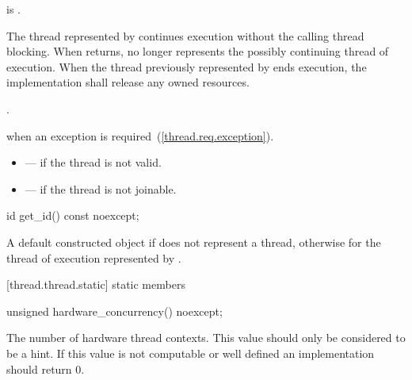 \begin{itemdescr}
\pnum\precondition {} is .

\pnum
\effects The thread represented by  continues execution without the calling thread
blocking. When  returns,  no longer represents the possibly continuing
thread of execution. When the thread previously represented by  ends execution, the
implementation shall release any owned resources.

\pnum\postcondition {}.

\pnum\throws {} when
an exception is required~(\ref{thread.req.exception}).

\pnum \errors
\begin{itemize}
\item {} --- if the thread is not valid.
\item {} --- if the thread is not joinable.
\end{itemize}
\end{itemdescr}

%
%
\begin{itemdecl}
id get_id() const noexcept;
\end{itemdecl}

\begin{itemdescr}
\pnum
\returns A default constructed  object if  does not represent a thread,
otherwise  for the thread of execution represented by
.
\end{itemdescr}

[thread.thread.static]{ static members}

%
%
\begin{itemdecl}
unsigned hardware_concurrency() noexcept;
\end{itemdecl}

\begin{itemdescr}
\pnum
\returns The number of hardware thread contexts. \enternote This value should
only be considered to be a hint. \exitnote If this value is not computable or
well defined an implementation should return 0.
\end{itemdescr}

